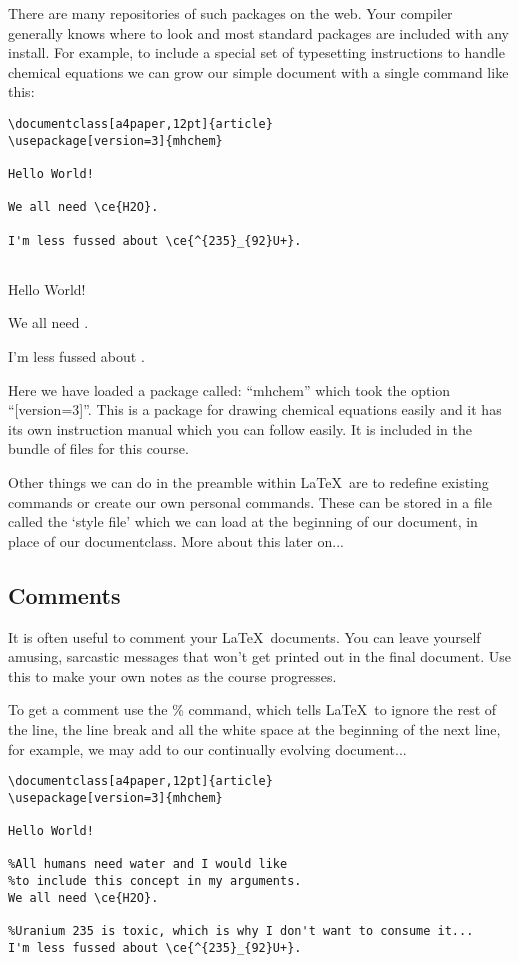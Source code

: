 There are many repositories of such packages on the web. Your compiler generally knows where to look and most standard packages are included with any install. For example, to include a special set of typesetting instructions to handle chemical equations we can grow our simple document with a single command like this:

\begin{verbatim}
\documentclass[a4paper,12pt]{article}
\usepackage[version=3]{mhchem}

Hello World!

We all need \ce{H2O}.

I'm less fussed about \ce{^{235}_{92}U+}.


\end{verbatim}

\vspace{2ex}

\pagebreak
\thispagestyle{empty}
Hello World!

We all need .

I'm less fussed about .
\pagebreak

Here we have loaded a package called: ``mhchem'' which took the option ``[version=3]''. This is a package for drawing chemical equations easily and it has its own instruction manual which you can follow easily. It is included in the bundle of files for this course.

Other things we can do in the preamble within \LaTeX\ are to redefine existing commands or create our own personal commands. These can be stored in a file called the `style file' which we can load at the beginning of our document, in place of our documentclass. More about this later on...


\subsection{Comments}
It is often useful to comment your \LaTeX\ documents. You can leave yourself amusing, sarcastic messages that won't get printed out in the final document. Use this to make your own notes as the course progresses.

To get a comment use the \% command, which tells \LaTeX\ to ignore the rest of the line, the line break and all the white space at the beginning of the next line, for example, we may add to our continually evolving document...

\begin{verbatim}
\documentclass[a4paper,12pt]{article}
\usepackage[version=3]{mhchem}

Hello World!

%All humans need water and I would like
%to include this concept in my arguments.
We all need \ce{H2O}.

%Uranium 235 is toxic, which is why I don't want to consume it...
I'm less fussed about \ce{^{235}_{92}U+}.


\end{verbatim}

